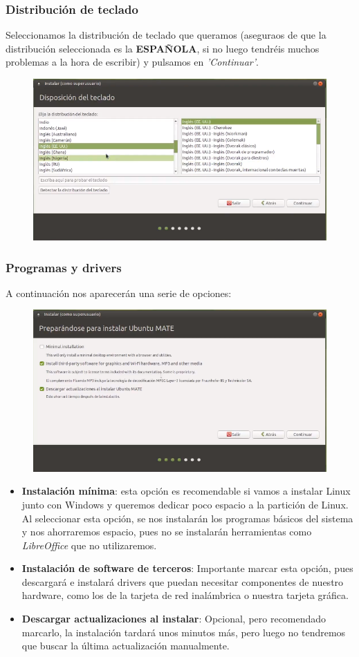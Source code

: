     \subsubsection{Distribución de teclado}
    Seleccionamos la distribución de teclado que queramos (aseguraos de que la distribución seleccionada es la \textbf{ESPAÑOLA}, si no luego tendréis muchos problemas a la hora de escribir) y pulsamos en \textit{'Continuar'}.
     \begin{figure}[H]
        \centering
        \includegraphics[width= 0.7 \textwidth]{Media/umate2.png}
    \end{figure}

\newpage    
\subsubsection{Programas y drivers} 
    A continuación nos aparecerán una serie de opciones:
     \begin{figure}[H]
        \centering
        \includegraphics[width= 0.7 \textwidth]{Media/umate3.png}
    \end{figure}
    \begin{itemize}
        \item \textbf{Instalación mínima}: esta opción es recomendable si vamos a instalar Linux junto con Windows y queremos dedicar poco espacio a la partición de Linux. Al seleccionar esta opción, se nos instalarán los programas básicos del sistema y nos ahorraremos espacio, pues no se instalarán herramientas como \textit{LibreOffice} que no utilizaremos.
        \item \textbf{Instalación de software de terceros}: Importante marcar esta opción, pues descargará e instalará drivers que puedan necesitar componentes de nuestro hardware, como los de la tarjeta de red inalámbrica o nuestra tarjeta gráfica.
        \item \textbf{Descargar actualizaciones al instalar}: Opcional, pero recomendado marcarlo, la instalación tardará unos minutos más, pero luego no tendremos que buscar la última actualización manualmente.
    \end{itemize}
   

